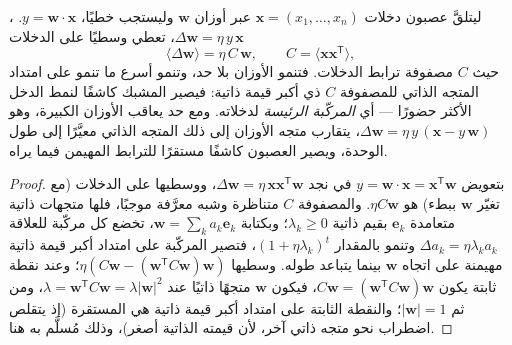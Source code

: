 \begin{theorem}\label{thm:b3:learning-memory:hebb}
ليتلقَّ عصبون دخلات $\mathbf{x} = (x_{1},\dots,x_{n})$ عبر
أوزان $\mathbf{w}$ وليستجب خطيًا، $y = \mathbf{w}\cdot\mathbf{x}$.
، $\Delta\mathbf{w} = \eta\, y\,\mathbf{x}$، تعطي وسطيًا
على الدخلات
\[
\langle\Delta\mathbf{w}\rangle = \eta\,C\,\mathbf{w}, \qquad C =
\langle\mathbf{x}\mathbf{x}^{\mathsf{T}}\rangle ,
\]
حيث $C$ مصفوفة ترابط الدخلات. فتنمو الأوزان بلا حد، وتنمو
أسرع ما تنمو على امتداد المتجه الذاتي للمصفوفة $C$ ذي أكبر
قيمة ذاتية: فيصير المشبك كاشفًا لنمط الدخل الأكثر حضورًا
--- أي \emph{المركّبة الرئيسة} لدخلاته. ومع حد يعاقب الأوزان
الكبيرة، وهو \emph{}
$\Delta\mathbf{w} = \eta\, y\,(\mathbf{x} - y\,\mathbf{w})$، يتقارب متجه
الأوزان إلى ذلك المتجه الذاتي معيَّرًا إلى طول الوحدة،
ويصير العصبون كاشفًا مستقرًا للترابط المهيمن فيما يراه.
\end{theorem}
\begin{proof}
بتعويض $y = \mathbf{w}\cdot\mathbf{x} = \mathbf{x}^{\mathsf{T}}
\mathbf{w}$ في  نجد $\Delta\mathbf{w} = \eta\,\mathbf{x}
\mathbf{x}^{\mathsf{T}}\mathbf{w}$، ووسطيها على الدخلات (مع
تغيّر $\mathbf{w}$ ببطء) هو $\eta C\mathbf{w}$. والمصفوفة $C$ متناظرة
وشبه معرَّفة موجبًا، فلها متجهات ذاتية متعامدة $\mathbf{e}_{k}$
بقيم ذاتية $\lambda_{k} \ge 0$؛ وبكتابة $\mathbf{w} = \sum_{k}
a_{k}\mathbf{e}_{k}$، تخضع كل مركّبة للعلاقة $\Delta a_{k} = \eta\lambda_{k}
a_{k}$ وتنمو بالمقدار $(1 + \eta\lambda_{k})^{t}$، فتصير المركّبة على
امتداد أكبر قيمة ذاتية مهيمنة على اتجاه $\mathbf{w}$
بينما يتباعد طوله.  وسطيها $\eta(C\mathbf{w} -
(\mathbf{w}^{\mathsf{T}}C\mathbf{w})\mathbf{w})$؛ وعند نقطة ثابتة
يكون $C\mathbf{w} = (\mathbf{w}^{\mathsf{T}}C\mathbf{w})\mathbf{w}$، فيكون
$\mathbf{w}$ متجهًا ذاتيًا عند $\lambda = \mathbf{w}^{\mathsf{T}}
C\mathbf{w} = \lambda|\mathbf{w}|^{2}$، ومن ثم $|\mathbf{w}| = 1$؛
والنقطة الثابتة على امتداد أكبر قيمة ذاتية هي المستقرة
(إذ يتقلص اضطراب نحو متجه ذاتي آخر، لأن قيمته الذاتية
أصغر)، وذلك مُسلَّم به هنا.
\end{proof}


